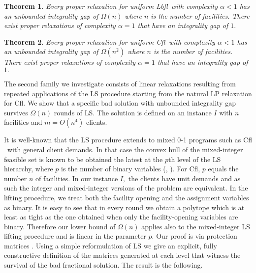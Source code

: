 \documentclass[11pt]{article}\usepackage{amsmath}
\newtheorem{theorem}{Theorem}[section]
\newcommand{\lbfl}{{\sc Lbfl}}
\newcommand{\cfl}{{\sc Cfl}}
\begin{document}
\begin{theorem}
\label{theorem:proper}
Every proper relaxation for uniform \lbfl\ with complexity $\alpha < 1$ has an
unbounded integrality gap of $\Omega(n)$ where $n$ is the number of
facilities. There exist proper relaxations of complexity $\alpha=1$ that have an
integrality gap of $1.$ 
\end{theorem}

\begin{theorem}
\label{theorem:proper2}
Every proper relaxation for uniform \cfl\ with complexity $\alpha < 1$ has an
unbounded integrality gap of $\Omega(n^2)$ where $n$ is the number of
facilities. There exist proper relaxations of complexity $\alpha=1$ that have an
integrality gap of $1.$ 
\end{theorem}


The second family we investigate consists of  linear  relaxations resulting from
repeated applications of the 
LS procedure starting from the natural LP relaxation for  \cfl\/.
We show that a specific bad solution with unbounded integrality gap 
 survives $\Omega(n)$ rounds of LS.
The solution is defined on an instance $I$ 
 with $n$ facilities and $m=\Theta(n^4)$ 
clients.    



It is  well-known that the LS procedure 
 extends to mixed 0-1  programs \cite{LovaszS91,BalasCC93} such as  \cfl
 \ with general client demands.  In that case the convex hull of the
 mixed-integer feasible set is known to be obtained the latest at the $p$th
 level of the LS hierarchy, where $p$ is the number of binary variables
 (\cite{LovaszS91},  \cite[Theorem~2.6]{BalasCC93}). For  \cfl,   
$p$ equals the number $n$ of facilities. 
In our instance 
$I,$ the clients have unit demands and as such the integer and
mixed-integer versions of the problem are 
equivalent. 
 In the lifting procedure, we treat  both the facility opening and the assignment
 variables as binary. 
It is easy to see that in  every round we obtain a polytope which is at least as tight as the one obtained 
when only the facility-opening variables are binary. 
 Therefore  our lower bound of $\Omega(n)$  applies also 
 to the mixed-integer LS lifting procedure and is linear in the parameter $p.$ 
Our proof is via protection matrices \cite{LovaszS91}. 
Using a simple reformulation of LS we give an explicit, fully
constructive definition of the matrices generated at each level that
witness the survival of the bad  fractional solution. 
The result is the following. 
\end{document}
